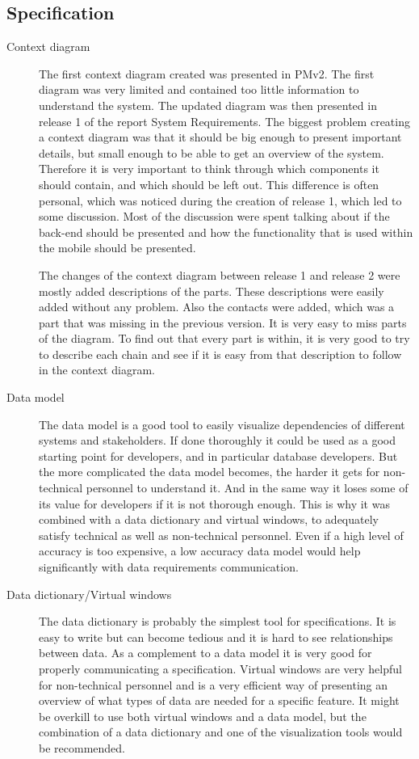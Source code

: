 \documentclass[10pt,a4paper]{article}
\begin{document}
\subsection{Specification}
\begin{description}
\item[Context diagram] The first context diagram created was presented in PMv2. The first diagram was very limited and contained too little information to understand the system. The updated diagram was then presented in release 1 of the report System Requirements. The biggest problem creating a context diagram was that it should be big enough to present important details, but small enough to be able to get an overview of the system. Therefore it is very important to think through which components it should contain, and which should be left out. This difference is often personal, which was noticed during the creation of release 1, which led to some discussion. Most of the discussion were spent talking about if the back-end should be presented and how the functionality that is used within the mobile should be presented. 

The changes of the context diagram between release 1 and release 2 were mostly added descriptions of the parts. These descriptions were easily added without any problem. Also the contacts were added, which was a part that was missing in the previous version. It is very easy to miss parts of the diagram. To find out that every part is within, it is very good to try to describe each chain and see if it is easy from that description to follow in the context diagram. 

\item[Data model] The data model is a good tool to easily visualize dependencies of different systems and stakeholders. If done  thoroughly it could be used as a good starting point for developers, and in particular database developers. But the more complicated the data model becomes, the harder it gets for non-technical personnel to understand it. And in the same way it loses some of its value for developers if it is not thorough enough. This is why it was combined with  a data dictionary and virtual windows, to adequately satisfy technical as well as non-technical personnel. Even if a high level of accuracy is too expensive, a low accuracy data model would help significantly with data requirements communication.

\item[Data dictionary/Virtual windows] The data dictionary is probably the simplest tool for specifications. It is easy to write but can become tedious and it is hard to see relationships between data. As a complement to a data model it is very good for properly communicating a specification. Virtual windows are very helpful for non-technical personnel and is a very efficient way of presenting an overview of what types of data are needed for a specific feature. It might be overkill to use both virtual windows and a data model, but the combination of a data dictionary and one of the visualization tools would be recommended. 


\end{description}
\end{document}
